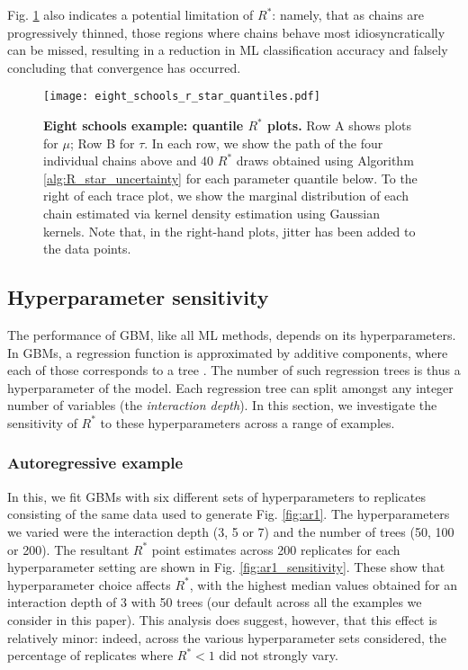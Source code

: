 \documentclass{article}
\begin{document}
Fig. \ref{fig:eight_schools_r_star_quantiles} also indicates a potential limitation of $R^*$: namely, that as chains are progressively thinned, those regions where chains behave most idiosyncratically can be missed, resulting in a reduction in ML classification accuracy and falsely concluding that convergence has occurred.

\begin{figure}[!htb]
	\centerline{\texttt{[image: eight\_schools\_r\_star\_quantiles.pdf]}}
	\caption{\textbf{Eight schools example: quantile $R^*$ plots.} Row A shows plots for $\mu$; Row B for $\tau$. In each row, we show the path of the four individual chains above and 40 $R^*$ draws obtained using Algorithm \ref{alg:R_star_uncertainty} for each parameter quantile below. To the right of each trace plot, we show the marginal distribution of each chain estimated via kernel density estimation using Gaussian kernels. Note that, in the right-hand plots, jitter has been added to the data points.}
	\label{fig:eight_schools_r_star_quantiles}
\end{figure}

\color{red}
\subsection{Hyperparameter sensitivity}\label{sec:hyperparameters}
The performance of GBM, like all ML methods, depends on its hyperparameters. In GBMs, a regression function is approximated by additive components, where each of those corresponds to a tree \cite{greenwell2019package}. The number of such regression trees is thus a hyperparameter of the model. Each regression tree can split amongst any integer number of variables (the \textit{interaction depth}). In this section, we investigate the sensitivity of $R^*$ to these hyperparameters across a range of examples. 

\subsubsection{Autoregressive example}\label{sec:heterogeneity_robustness}
In this, we fit GBMs with six different sets of hyperparameters to replicates consisting of the same data used to generate Fig. \ref{fig:ar1}. The hyperparameters we varied were the interaction depth (3, 5 or 7) and the number of trees (50, 100 or 200). The resultant $R^*$ point estimates across 200 replicates for each hyperparameter setting are shown in Fig. \ref{fig:ar1_sensitivity}. These show that hyperparameter choice affects $R^*$, with the highest median values obtained for an interaction depth of 3 with 50 trees (our default across all the examples we consider in this paper). This analysis does suggest, however, that this effect is relatively minor: indeed, across the various hyperparameter sets considered, the percentage of replicates where $R^*<1$ did not strongly vary.
\end{document}
